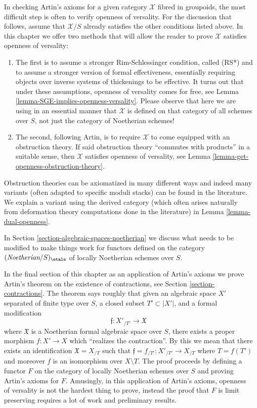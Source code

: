 \medskip\noindent
In checking Artin's axioms for a given category $\mathcal{X}$ fibred
in groupoids, the most difficult step is often to verify openness
of versality. For the discussion that follows, assume that $\mathcal{X}/S$
already satisfies the other conditions listed above.
In this chapter we offer two methods that will allow the reader
to prove $\mathcal{X}$ satisfies openness of versality:
\begin{enumerate}
\item The first is to assume a stronger Rim-Schlessinger
condition, called (RS*) and to assume a stronger version of
formal effectiveness, essentially requiring objects over
inverse systems of thickenings to be effective. It turns out
that under these assumptions, openness of versality comes for
free, see Lemma \ref{lemma-SGE-implies-openness-versality}.
Please observe that here we are using in an essential manner
that $\mathcal{X}$ is defined on that category of all schemes
over $S$, not just the category of Noetherian schemes!
\item The second, following Artin, is to require $\mathcal{X}$
to come equipped with an obstruction theory. If said obstruction
theory ``commutes with products'' in a suitable sense, then
$\mathcal{X}$ satisfies openness of versality, see
Lemma \ref{lemma-get-openness-obstruction-theory}.
\end{enumerate}
Obstruction theories can be axiomatized in many different ways
and indeed many variants (often adapted to specific moduli stacks)
can be found in the literature. We explain a variant using the derived category
(which often arises naturally from deformation theory computations
done in the literature) in Lemma \ref{lemma-dual-openness}.

\medskip\noindent
In Section \ref{section-algebraic-spaces-noetherian}
we discuss what needs to be modified to make
things work for functors defined on the category
$(\textit{Noetherian}/S)_\etale$ of locally Noetherian
schemes over $S$.

\medskip\noindent
In the final section of this chapter as an application of Artin's axioms
we prove Artin's theorem on the existence of contractions, see
Section \ref{section-contractions}. The theorem says roughly that given an
algebraic space $X'$ separated of finite type over $S$,
a closed subset $T' \subset |X'|$, and a formal modification
$$
\mathfrak{f} : X'_{/T'} \longrightarrow \mathfrak{X}
$$
where $\mathfrak{X}$ is a Noetherian formal algebraic space over $S$,
there exists a proper morphism $f : X' \to X$ which
``realizes the contraction''. By this we mean that there exists an
identification $\mathfrak{X} = X_{/T}$ such that
$\mathfrak{f} = f_{/T'} : X'_{/T'} \to X_{/T}$ where $T = f(T')$
and moreover $f$ is an isomorphism over $X \setminus T$. The proof proceeds
by defining a functor $F$ on the category of locally Noetherian schemes
over $S$ and proving Artin's axioms for $F$. Amusingly, in this
application of Artin's axioms, openness of versality is not the hardest
thing to prove, instead the proof that $F$ is limit preserving requires
a lot of work and preliminary results.




